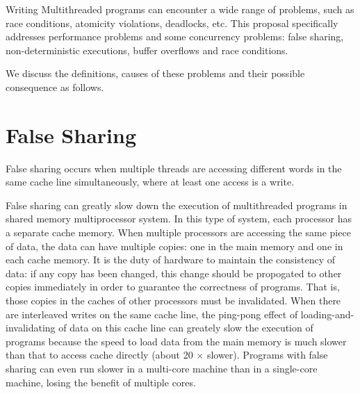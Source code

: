 
Writing Multithreaded programs can encounter a wide range of problems,
such as race conditions, atomicity violations, deadlocks, etc.
This proposal specifically addresses performance problems and some concurrency problems: 
false sharing, non-deterministic executions,
buffer overflows and race conditions.  


We discuss the definitions, causes of these problems and their possible consequence as follows.

\section{False Sharing}
\label{falsesharing}
False sharing occurs when multiple threads are accessing different
words in the same cache line simultaneously, where at least one access is a write.

False sharing can greatly slow down the execution of multithreaded programs 
in shared memory multiprocessor system.
In this type of system, each processor has a separate cache memory. 
When multiple processors are accessing the same piece of data, 
the data can have multiple copies: 
one in the main memory and one in each cache memory.
It is the duty of hardware to maintain the consistency of data: 
if any copy has been changed, this change should be propogated to other copies immediately
in order to guarantee the correctness of programs. 
That is, those copies in the caches of other processors must be invalidated.
When there are interleaved writes on the same cache line, the ping-pong effect of 
loading-and-invalidating of data on this cache line can  
greately slow the execution of programs
because the speed to load data from the main memory is much slower than that to access cache directly
(about 20 $\times$ slower). 
Programs with false sharing can even run slower in a multi-core machine 
than in a single-core machine, losing the benefit of multiple cores.  

